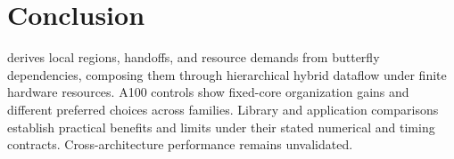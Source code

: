 \section{Conclusion}
\system{} derives local regions, handoffs, and resource demands from butterfly
dependencies, composing them through hierarchical hybrid dataflow under finite
hardware resources. A100 controls show fixed-core organization gains and
different preferred choices across families. Library and application
comparisons establish practical benefits and limits under their stated
numerical and timing contracts. Cross-architecture performance remains
unvalidated.
